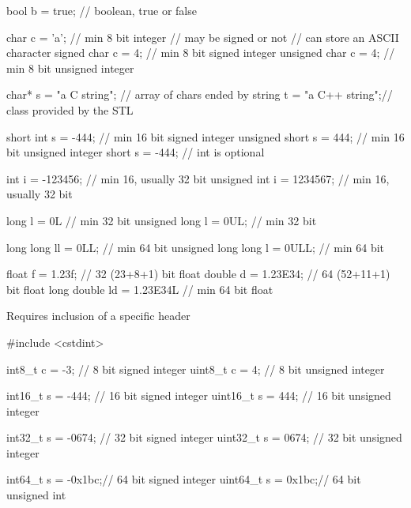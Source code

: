 \begin{frame}[fragile]
  \begin{cppcode}
    bool b = true;            // boolean, true or false

    char c = 'a';             // min 8 bit integer
                              // may be signed or not
                              // can store an ASCII character
    signed char c = 4;        // min 8 bit signed integer
    unsigned char c = 4;      // min 8 bit unsigned integer

    char* s = "a C string";   // array of chars ended by \0
    string t = "a C++ string";// class provided by the STL

    short int s = -444;       // min 16 bit signed integer
    unsigned short s = 444;   // min 16 bit unsigned integer
    short s = -444;           // int is optional
  \end{cppcode}
\end{frame}
\begin{frame}[fragile]
  \begin{cppcode}
    int i = -123456;          // min 16, usually 32 bit
    unsigned int i = 1234567; // min 16, usually 32 bit

    long l = 0L               // min 32 bit
    unsigned long l = 0UL;    // min 32 bit

    long long ll = 0LL;          // min 64 bit
    unsigned long long l = 0ULL; // min 64 bit

    float f = 1.23f;          // 32 (23+8+1) bit float
    double d = 1.23E34;       // 64 (52+11+1) bit float
    long double ld = 1.23E34L // min 64 bit float
  \end{cppcode}
\end{frame}

\begin{frame}[fragile]
  \alert{Requires inclusion of a specific header}
  \begin{cppcode}
    #include <cstdint>

    int8_t c = -3;     // 8 bit signed integer
    uint8_t c = 4;     // 8 bit unsigned integer

    int16_t s = -444;  // 16 bit signed integer
    uint16_t s = 444;  // 16 bit unsigned integer

    int32_t s = -0674; // 32 bit signed integer
    uint32_t s = 0674; // 32 bit unsigned integer

    int64_t s = -0x1bc;// 64 bit signed integer
    uint64_t s = 0x1bc;// 64 bit unsigned int
    \end{cppcode}
\end{frame}

